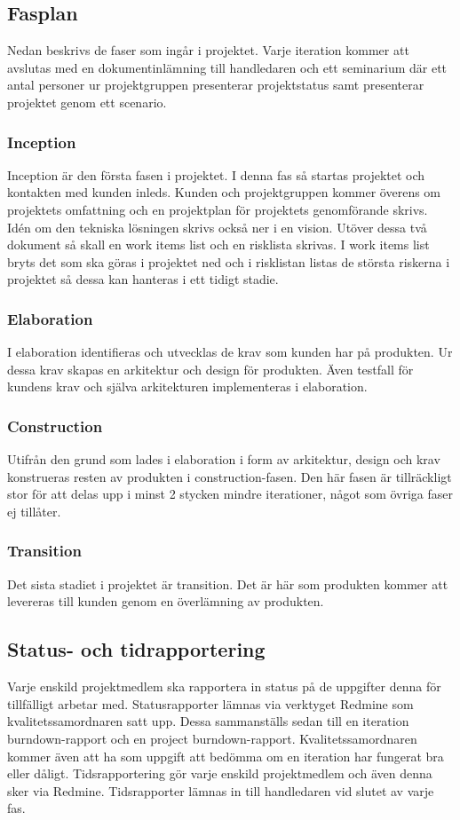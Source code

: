 \subsection{Fasplan}
Nedan beskrivs de faser som ingår i projektet. Varje iteration kommer att avslutas med en dokumentinlämning till handledaren och ett seminarium där ett antal personer ur projektgruppen presenterar projektstatus samt presenterar projektet genom ett scenario.

\subsubsection*{Inception}
Inception är den första fasen i projektet. I denna fas så startas projektet och kontakten med kunden inleds. Kunden och projektgruppen kommer överens om projektets omfattning och en projektplan för projektets genomförande skrivs. Idén om den tekniska lösningen skrivs också ner i en vision. Utöver dessa två dokument så skall en work items list och en risklista skrivas. I work items list bryts det som ska göras i projektet ned och i risklistan listas de största riskerna i projektet så dessa kan hanteras i ett tidigt stadie.

\subsubsection*{Elaboration}
I elaboration identifieras och utvecklas de krav som kunden har på produkten. Ur dessa krav skapas en arkitektur och design för produkten. Även testfall för kundens krav och själva arkitekturen implementeras i elaboration.

\subsubsection*{Construction}
Utifrån den grund som lades i elaboration i form av arkitektur, design och krav konstrueras resten av produkten i construction-fasen. Den här fasen är tillräckligt stor för att delas upp i minst 2 stycken mindre iterationer, något som övriga faser ej tillåter.

\subsubsection*{Transition}
Det sista stadiet i projektet är transition. Det är här som produkten kommer att levereras till kunden genom en överlämning av produkten.

\subsection{Status- och tidrapportering}
Varje enskild projektmedlem ska rapportera in status på de uppgifter denna för tillfälligt arbetar med. Statusrapporter lämnas via verktyget Redmine som kvalitetssamordnaren satt upp. Dessa sammanställs sedan till en iteration burndown-rapport och en project burndown-rapport. Kvalitetssamordnaren kommer även att ha som uppgift att bedömma om en iteration har fungerat bra eller dåligt.
Tidsrapportering gör varje enskild projektmedlem och även denna sker via Redmine. Tidsrapporter lämnas in till handledaren vid slutet av varje fas.


